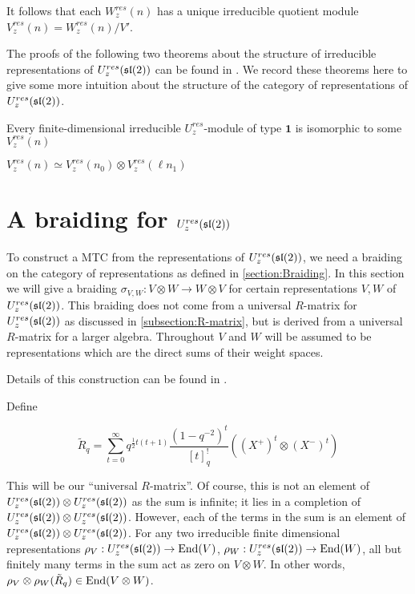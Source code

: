 It follows that each $W_z^{res}(n)$ has a unique irreducible quotient module
$V_z^{res}(n) = W_z^{res}(n) / V'$. 

The proofs of the following two theorems about the structure of irreducible
representations of $U_z^{res}(\mathfrak{sl}(2))$ can be found in \cite{CP}. We record
these theorems here to give some more intuition about the structure of the
category of representations of $U_z^{res}(\mathfrak{sl}(2))$.
\begin{theorem}
Every finite-dimensional irreducible $U_z^{res}$-module of type $\mathbf{1}$ is isomorphic to some $V_z^{res}(n)$
\end{theorem}

\begin{theorem}
$V_z^{res}(n) \simeq V_z^{res}(n_0) \otimes V_{z}^{res}(\ell n_1)$
\end{theorem}

\section{A braiding for $U_z^{res}(\mathfrak{sl}(2))$}
\label{section:braiding}

To construct a MTC from the representations of $U_z^{res}(\mathfrak{sl}(2))$, we need a
braiding on the category of representations as defined in
\ref{section:Braiding}.  In this section we will give a braiding $\sigma_{V,W}:
V \otimes W \to W \otimes V$ for certain representations $V,W$ of
$U_z^{res}(\mathfrak{sl}(2))$.  This braiding does not
come from a universal $R$-matrix for $U_z^{res}(\mathfrak{sl}(2))$ as discussed in
\ref{subsection:R-matrix}, but is derived from a universal $R$-matrix for a
larger algebra. Throughout $V$ and $W$ will be assumed to be representations
which are the direct sums of their weight spaces.

Details of this construction can be found in \cite{CP}.


Define 

\begin{equation}
\tilde{R}_q = \sum_{t=0}^\infty q^{\frac{1}{2} t(t+1)} \frac{(1-q^{-2})^t}{[t]_q^{!}} ((X^+)^t \otimes (X^-)^t)
\end{equation}

This will be our ``universal $R$-matrix''. Of course, this is not an element of
$U_z^{res}(\mathfrak{sl}(2)) \otimes U_z^{res}(\mathfrak{sl}(2))$ as the sum is infinite; it lies in a
completion of $U_z^{res}(\mathfrak{sl}(2)) \otimes U_z^{res}(\mathfrak{sl}(2))$. However, each of the terms
in the sum is an element of $U_z^{res}(\mathfrak{sl}(2)) \otimes U_z^{res}(\mathfrak{sl}(2))$. For any
two irreducible finite dimensional representations $\rho_V : U_z^{res}(\mathfrak{sl}(2)) \to
\operatorname{End}(V)$, $\rho_W : U_z^{res}(\mathfrak{sl}(2)) \to \operatorname{End}(W)$, all but finitely many terms in the
sum act as zero on $V \otimes W$. In other words, $\rho_V \otimes \rho_W
(\tilde{R}_q) \in \operatorname{End}(V \otimes W)$. 

